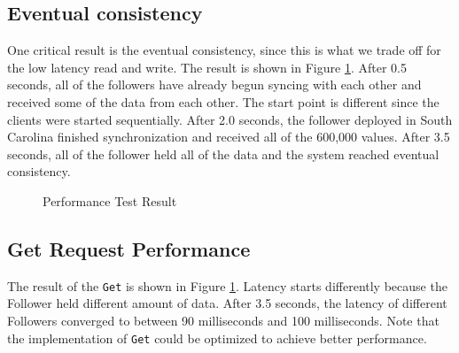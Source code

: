 \documentclass[11pt,english,twocolumn]{article}
\begin{document}
 \vspace{-0.5cm}
\subsection{Eventual consistency}
One critical result is the eventual consistency, since this is what we trade off
for the low latency read and write. The result is shown in Figure
\ref{ConsistencyDelay}. After 0.5 seconds, all of the followers have already
begun syncing with each other and received some of the data from each other. The
start point is different since the clients were started sequentially. After 2.0
seconds, the follower deployed in South Carolina finished synchronization and
received all of the 600,000 values. After 3.5 seconds, all of the follower held
all of the data and the system reached eventual consistency.

\begin{figure}[h]
\caption{Performance Test Result}
\vspace{-0.4cm}
\label{ConsistencyDelay}
\end{figure}

\subsection{Get Request Performance}
The result of the \texttt{Get} is shown in Figure \ref{ConsistencyDelay}.
Latency starts differently because the Follower held different amount of data.
After 3.5 seconds, the latency of different Followers converged to between 90
milliseconds and 100 milliseconds. Note that the implementation of \texttt{Get}
could be optimized to achieve better performance.
\end{document}

